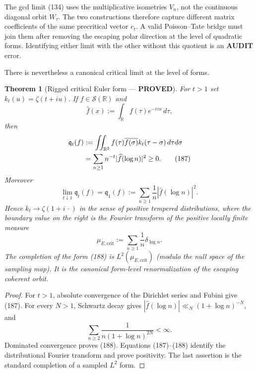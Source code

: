 \documentclass[11pt]{article}
\newtheorem{theorem}{Theorem}
\newcommand{\PROVED}{\textcolor{green!45!black}{\textbf{PROVED}}}
\newcommand{\AUDIT}{\textcolor{orange!75!black}{\textbf{AUDIT}}}
\begin{document}
The gcd limit (134) uses the multiplicative isometries $V_n$, not the
continuous diagonal orbit $W_\tau$.  The two constructions therefore capture
different matrix coefficients of the same precritical vector $e_t$.  A valid
Poisson--Tate bridge must join them after removing the escaping polar
direction at the level of quadratic forms.  Identifying either limit with the
other without this quotient is an \AUDIT{} error.

There is nevertheless a canonical critical limit at the level of forms.

\begin{theorem}[Rigged critical Euler form --- \PROVED]
For $t>1$ set $k_t(u)=\zeta(t+iu)$.  If $f\in\mathcal S(\mathbb R)$ and
\begin{equation}
 \widehat f(x):=\int_{\mathbb R}f(\tau)e^{-i\tau x}\,d\tau,
\end{equation}
then
\begin{align}
 \mathfrak q_t(f)
 &:=\iint_{\mathbb R^2}f(\tau)\overline{f(\sigma)}
       k_t(\tau-\sigma)\,d\tau d\sigma                 \notag\\
 &=\sum_{n\ge1}n^{-t}|\widehat f(\log n)|^2\ge0.      \tag{187}
\end{align}
Moreover
\begin{equation}
 \lim_{t\downarrow1}\mathfrak q_t(f)
 =\mathfrak q_1(f)
 :=\sum_{n\ge1}\frac1n|\widehat f(\log n)|^2.         \tag{188}
\end{equation}
Hence $k_t\to\zeta(1+i\,\cdot)$ in the sense of positive tempered
distributions, where the boundary value on the right is the Fourier transform
of the positive locally finite measure
\begin{equation}
 \mu_{E,\mathrm{crit}}:=\sum_{n\ge1}\frac1n\delta_{\log n}. \tag{189}
\end{equation}
The completion of the form (188) is
$L^2(\mu_{E,\mathrm{crit}})$ (modulo the null space of the sampling map).
It is the canonical form-level renormalization of the escaping coherent
orbit.
\end{theorem}

\begin{proof}
For $t>1$, absolute convergence of the Dirichlet series and Fubini give
(187).  For every $N>1$, Schwartz decay gives
$|\widehat f(\log n)|\ll_N(1+\log n)^{-N}$, and
\[
 \sum_{n\ge2}\frac1{n(1+\log n)^{2N}}<\infty.
\]
Dominated convergence proves (188).  Equations (187)--(188) identify the
distributional Fourier transform and prove positivity.  The last assertion
is the standard completion of a sampled $L^2$ form.
\end{proof}
\end{document}
